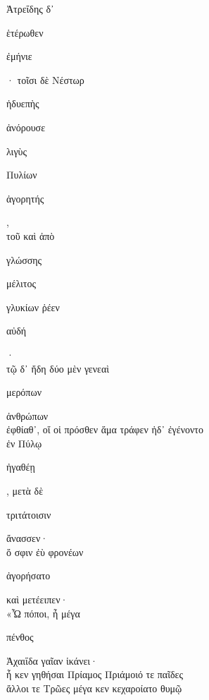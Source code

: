 \documentclass{ransom}
\begin{document}
\renewcommand{\rightheaderwhat}{\rightheaderwhatglosses}%
\begin{foreignpage}
\begin{graytext}
Ἀτρεΐδης δ᾽ \begin{whitetext}ἑτέρωθεν\end{whitetext} \begin{whitetext}ἐμήνιε\end{whitetext}· τοῖσι δὲ Νέστωρ\\
\begin{whitetext}ἡδυεπὴς\end{whitetext} \begin{whitetext}ἀνόρουσε\end{whitetext} \begin{whitetext}λιγὺς\end{whitetext} Πυλίων \begin{whitetext}ἀγορητής\end{whitetext},\\
τοῦ καὶ ἀπὸ \begin{whitetext}γλώσσης\end{whitetext} \begin{whitetext}μέλιτος\end{whitetext} γλυκίων ῥέεν \begin{whitetext}αὐδή\end{whitetext}·\\
τῷ δ᾽ ἤδη δύο μὲν γενεαὶ \begin{whitetext}μερόπων\end{whitetext} ἀνθρώπων\hfill{}\\
ἐφθίαθ᾽, οἵ οἱ πρόσθεν ἅμα τράφεν ἠδ᾽ ἐγένοντο\\
ἐν Πύλῳ \begin{whitetext}ἠγαθέῃ\end{whitetext}, μετὰ δὲ \begin{whitetext}τριτάτοισιν\end{whitetext} ἄνασσεν·\\
ὅ σφιν ἐὺ φρονέων \begin{whitetext}ἀγορήσατο\end{whitetext} καὶ μετέειπεν·\\
«Ὦ πόποι, ἦ μέγα \begin{whitetext}πένθος\end{whitetext} Ἀχαιΐδα γαῖαν ἱκάνει·\\
ἦ κεν γηθήσαι Πρίαμος Πριάμοιό τε παῖδες\hfill{}\\
ἄλλοι τε Τρῶες μέγα κεν κεχαροίατο θυμῷ\\

\end{graytext}
\end{foreignpage}
\end{document}
